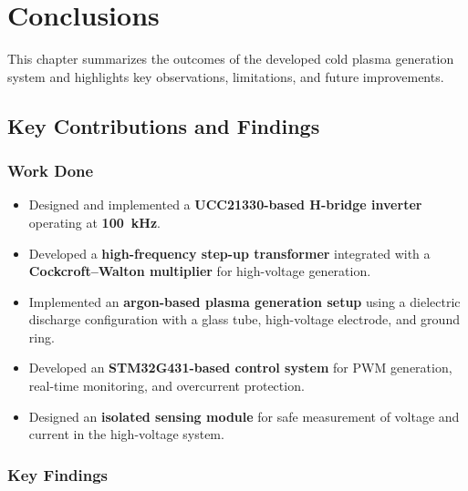 \chapter{Conclusions}\label{chap-conc}
\thispagestyle{empty}

This chapter summarizes the outcomes of the developed cold plasma generation system and highlights key observations, limitations, and future improvements.

\vspace{0.5cm}

\section{Key Contributions and Findings}

\subsection{Work Done}

\begin{itemize}
    \item Designed and implemented a \textbf{UCC21330-based H-bridge inverter} operating at \textbf{100~kHz}.
    
    \item Developed a \textbf{high-frequency step-up transformer} integrated with a \textbf{Cockcroft--Walton multiplier} for high-voltage generation.
    
    \item Implemented an \textbf{argon-based plasma generation setup} using a dielectric discharge configuration with a glass tube, high-voltage electrode, and ground ring.
    
    \item Developed an \textbf{STM32G431-based control system} for PWM generation, real-time monitoring, and overcurrent protection.
    
    \item Designed an \textbf{isolated sensing module} for safe measurement of voltage and current in the high-voltage system.
\end{itemize}
\newpage
\subsection{Key Findings}


